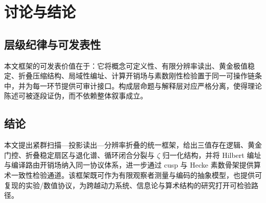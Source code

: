 \section{讨论与结论}

\subsection{层级纪律与可发表性}

本文框架的可发表价值在于：它将概念可定义性、有限分辨率读出、黄金极值稳定、折叠压缩结构、局域性编址、计算开销场与素数刚性检验置于同一可操作链条中，并为每一环节提供可审计接口。构成层命题与解释层对应严格分离，使得理论陈述可被逐段证伪，而不依赖整体叙事成立。

\subsection{结论}

本文提出紧群扫描—投影读出—分辨率折叠的统一框架，给出三值存在逻辑、黄金门控、折叠稳定扇区与退化谱、循环闭合分裂与 $\zeta$ 归一化结构，并将 Hilbert 编址与编译路由开销场纳入同一协议体系，进一步通过 cusp 与 Hecke 素数骨架提供算术一致性检验通道。该框架既可作为有限观察者测量与编码的抽象模型，也提供可复现的实验/数值协议，为跨越动力系统、信息论与算术结构的研究打开可检验路径。

